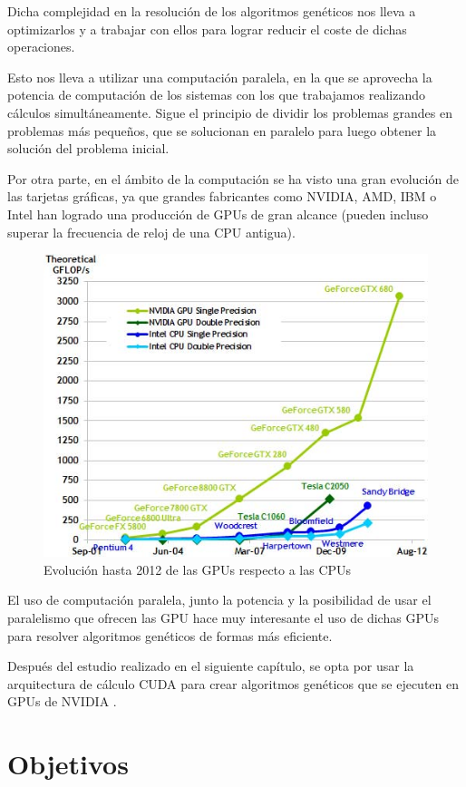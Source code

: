 Dicha complejidad en la resolución de los algoritmos genéticos nos lleva a optimizarlos y a trabajar con ellos para lograr reducir el coste de dichas operaciones. 

Esto nos lleva a utilizar una computación paralela, en la que se aprovecha la potencia de computación de los sistemas con los que trabajamos realizando cálculos simultáneamente. Sigue el principio de dividir los problemas grandes en problemas más pequeños, que se solucionan en paralelo para luego obtener la solución del problema inicial.

Por otra parte, en el ámbito de la computación se ha visto una gran evolución de las tarjetas gráficas, ya que grandes fabricantes como NVIDIA, AMD, IBM o Intel han logrado una producción de GPUs de gran alcance (pueden incluso superar la frecuencia de reloj de una CPU antigua).

\bigskip
\begin{figure}[h]
	\centering
	\includegraphics[width=0.7\linewidth]{../images/gpu_vs_cpu}
	\caption[Evolución de las GPUs respecto a las CPUs]{Evolución hasta 2012 de las GPUs respecto a las CPUs}
	\label{fig:gpu_vs_cpu}
\end{figure}


\bigskip
El uso de computación paralela, junto la potencia y la posibilidad de usar el paralelismo que ofrecen las GPU  hace muy interesante el uso de dichas GPUs para resolver algoritmos genéticos de formas más eficiente.

Después del estudio realizado en el siguiente capítulo, se opta por usar la arquitectura de cálculo CUDA \cite{nvidiacuda} para crear algoritmos genéticos que se ejecuten en GPUs de NVIDIA \cite{nvidiadeveloper}.


\bigskip
\section{Objetivos}
\bigskip


